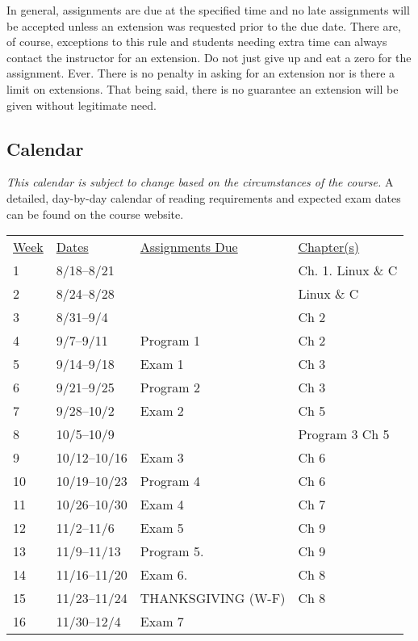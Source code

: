 \documentclass[10pt]{article}
\begin{document}
In general, assignments are due at the specified time and no late assignments will be accepted unless an extension was requested prior to the due date. There are, of course, exceptions to this rule and students needing extra time can always contact the instructor for an extension. Do not just give up and eat a zero for the assignment. Ever. There is no penalty in asking for an extension nor is there a limit on extensions.  That being said, there is no guarantee an extension will be given without legitimate need.
\subsection{Calendar}

\textit{This calendar is subject to change based on the circumstances of the course.} A detailed, day-by-day calendar of reading requirements and expected exam dates can be found on the course website.

\begin{center}
\begin{tabular}{llll}
\underline{Week} & \underline{Dates} & \underline{Assignments Due} & \underline{Chapter(s)}\\
1 & 8/18--8/21  &  & Ch. 1. Linux \& C \\
2 & 8/24--8/28 &  &  Linux \& C \\
3 & 8/31--9/4 &  &  Ch 2 \\
4 & 9/7--9/11  & Program 1 &  Ch 2 \\
5 & 9/14--9/18 & Exam 1 & Ch 3 \\
6 & 9/21--9/25 & Program 2 & Ch 3 \\
7 & 9/28--10/2 & Exam 2  &  Ch 5 \\
8 & 10/5--10/9 & & Program 3 Ch 5 \\
9 & 10/12--10/16 & Exam 3 &  Ch 6 \\
10 & 10/19--10/23  & Program 4 & Ch 6 \\
11 & 10/26--10/30 & Exam 4 &  Ch 7 \\
12 & 11/2--11/6 & Exam 5 & Ch 9 \\
13 & 11/9--11/13 &  Program 5. & Ch 9 \\
14 & 11/16--11/20 & Exam 6. & Ch 8 \\
15 & 11/23--11/24 &  THANKSGIVING (W-F)  &  Ch 8 \\
16 & 11/30--12/4 & Exam 7 &  \\
\end{tabular}
\end{center}
\end{document}
